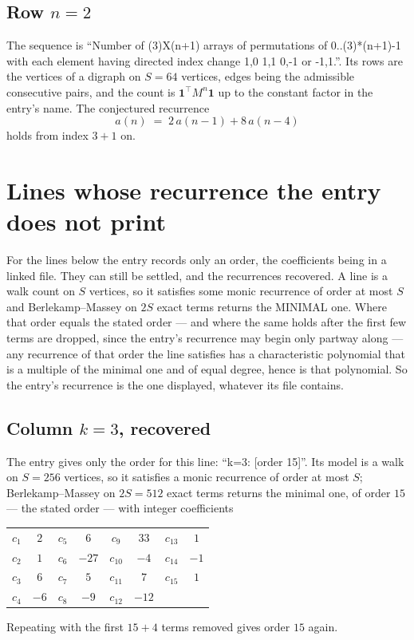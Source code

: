 \documentclass[11pt,a4paper]{article}
\theoremstyle{plain}
\theoremstyle{definition}
\begin{document}
\subsection*{Row $n$$=2$}
The sequence is ``Number of (3)X(n+1) arrays of permutations of 0..(3)*(n+1)-1 with each element having directed index change 1,0 1,1 0,-1 or -1,1.''. Its rows are the vertices of a digraph on
$S=64$ vertices, edges being the admissible consecutive pairs, and the count is
$\mathbf{1}^{\!\top}M^{n}\mathbf{1}$ up to the constant factor in the entry's name.
The conjectured recurrence
\[
a(n)\;=\;2\,a(n-1) + 8\,a(n-4)
\]
holds from index $3+1$ on.


\section{Lines whose recurrence the entry does not print}

For the lines below the entry records only an order, the coefficients being in a linked file.
They can still be settled, and the recurrences recovered. A line is a walk count on $S$
vertices, so it satisfies some monic recurrence of order at most $S$ and Berlekamp--Massey on
$2S$ exact terms returns the MINIMAL one. Where that order equals the stated order --- and
where the same holds after the first few terms are dropped, since the entry's recurrence may
begin only partway along --- any recurrence of that order the line satisfies has a
characteristic polynomial that is a multiple of the minimal one and of equal degree, hence is
that polynomial. So the entry's recurrence is the one displayed, whatever its file contains.

\subsection*{Column $k=3$, recovered}
The entry gives only the order for this line: ``k=3: [order 15]''. Its model is a walk on
$S=256$ vertices, so it satisfies a monic recurrence of order at most $S$;
Berlekamp--Massey on $2S=512$ exact terms returns the minimal one, of order
$15$ --- the stated order --- with integer coefficients
\begin{center}\small\begin{tabular}{cccccccc}
$c_{1}$ & $2$ & $c_{5}$ & $6$ & $c_{9}$ & $33$ & $c_{13}$ & $1$ \\
$c_{2}$ & $1$ & $c_{6}$ & $-27$ & $c_{10}$ & $-4$ & $c_{14}$ & $-1$ \\
$c_{3}$ & $6$ & $c_{7}$ & $5$ & $c_{11}$ & $7$ & $c_{15}$ & $1$ \\
$c_{4}$ & $-6$ & $c_{8}$ & $-9$ & $c_{12}$ & $-12$ &  &  \\
\end{tabular}\end{center}
Repeating with the first $15+4$ terms removed gives order $15$ again.
\end{document}
